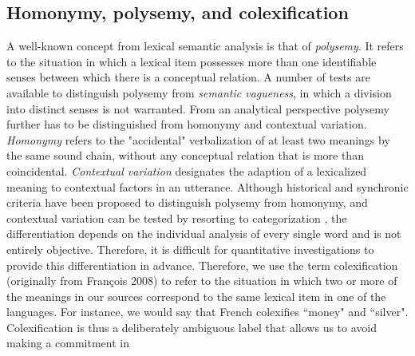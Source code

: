 \subsection{Homonymy, polysemy, and colexification}
A well-known concept from lexical semantic analysis is that of \emph{polysemy}. It refers to the situation
in which a lexical item possesses more than one identifiable senses between which there is a
conceptual relation. A number of tests are available to distinguish polysemy from \emph{semantic
vagueness}, in which a division into distinct senses is not warranted. From an analytical perspective
polysemy further has to be distinguished from {homonymy} and contextual variation.
\emph{Homonymy} refers to
the "accidental" verbalization of at least two meanings by the same sound chain, without any
conceptual relation that is more than coincidental. \emph{Contextual variation}
designates the adaption of a lexicalized meaning to contextual factors in an utterance. Although
historical and synchronic criteria have been proposed to distinguish polysemy from homonymy, and
contextual variation can be tested by resorting to categorization \cite{blank1997}, the
differentiation depends on the individual analysis of every single word and is not entirely
objective. Therefore, it is difficult for quantitative investigations to provide this differentiation
in advance.
Therefore, we use the term colexification (originally from Fran\c{c}ois 2008)
\nocite{francois2008}
to refer to the situation
in which two or more of the meanings in our sources correspond to the same lexical item in one of
the languages. For instance, we would say that French colexifies ``money" and ``silver".
Colexification is thus a deliberately ambiguous label that allows us to avoid making a commitment in
